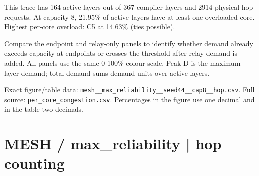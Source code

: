 \documentclass[10pt,a4paper]{article}
\begin{document}
This trace has 164 active layers out of 367 compiler layers and 2914 physical hop requests. At capacity 8, 21.95\% of active layers have at least one overloaded core. Highest per-core overload: C5 at 14.63\% (ties possible).\par
Compare the endpoint and relay-only panels to identify whether demand already exceeds capacity at endpoints or crosses the threshold after relay demand is added. All panels use the same 0-100\% colour scale. Peak D is the maximum layer demand; total demand sums demand units over active layers.\par
Exact figure/table data: \href{\detokenize{file:///home/dhruv-pansuriya/Documents/BTP/Compiler-Driven-ACE/output/pdf/qaoa_methods_congestion/tables/mesh__max_reliability__seed44__cap8__hop.csv}}{\nolinkurl{mesh__max_reliability__seed44__cap8__hop.csv}}. Full source: \href{\detokenize{file:///home/dhruv-pansuriya/Documents/BTP/Compiler-Driven-ACE/results/qaoa_2seed_2026-10-26/congestion/per_core_congestion.csv}}{\nolinkurl{per_core_congestion.csv}}. Percentages in the figure use one decimal and in the table two decimals.\par
\clearpage
\section*{MESH / max\_reliability | hop counting}
\end{document}
